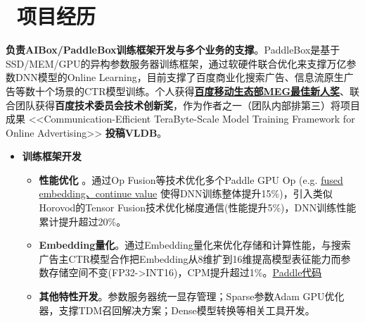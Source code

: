 \documentclass{resume}
\begin{document}
\section{\faUsers\ 项目经历}
\begin{onehalfspacing}
\textbf{负责AIBox/PaddleBox训练框架开发与多个业务的支撑}。PaddleBox是基于SSD/MEM/GPU的异构参数服务器训练框架，通过软硬件联合优化来支撑万亿参数DNN模型的Online Learning，目前支撑了百度商业化搜索广告、信息流原生广告等数十个场景的CTR模型训练。个人获得\href{https://baidu.com}{\textbf{百度移动生态部MEG最佳新人奖}}、联合团队获得\textbf{百度技术委员会技术创新奖}，作为作者之一（团队内部排第三）将项目成果 <<Communication-Efficient TeraByte-Scale Model Training Framework for Online Advertising>> \textbf{投稿VLDB}。
\begin{itemize}%
\item \textbf{训练框架开发}

\begin{itemize}
\item \textbf{性能优化} 。通过Op Fusion等技术优化多个Paddle GPU Op (e.g. \href{https://github.com/neuzxy/Paddle/commit/5e6f8bf1f38622571d868e35bb99ccb924856aee}{fused embedding、continue value} 使得DNN训练整体提升15\%)，引入类似Horovod的Tensor Fusion技术优化梯度通信(性能提升5\%)，DNN训练性能累计提升超过20\%。
\item \textbf{Embedding量化}。通过Embedding量化来优化存储和计算性能，与搜索广告主CTR模型合作把Embedding从8维扩到16维提高模型表征能力而参数存储空间不变(FP32->INT16)，CPM提升超过1\%。\href{https://github.com/neuzxy/Paddle/commit/1c5c0591ec3402c31eaa32a31c62e9fc518a11f2}{Paddle代码}
\item \textbf{其他特性开发}。参数服务器统一显存管理；Sparse参数Adam GPU优化器，支撑TDM召回解决方案；Dense模型转换等相关工具开发。
\end{itemize}


\end{itemize}
\end{onehalfspacing}
\end{document}
